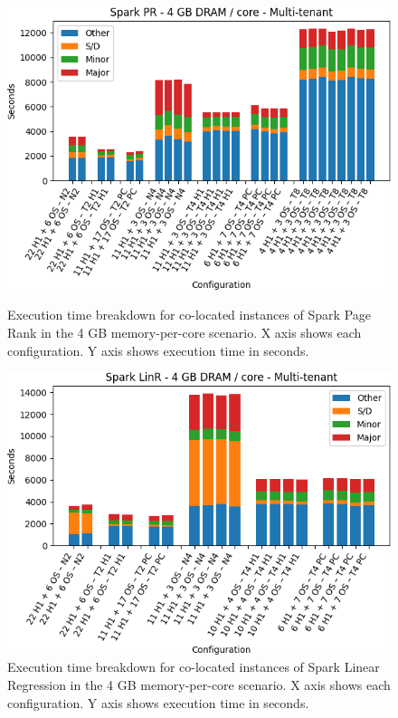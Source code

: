 \begin{figure}[thbp]
\centering
    \includegraphics[width=\linewidth]{./fig/pr64.png}
    \caption{Execution time breakdown for co-located instances of Spark
    Page Rank in the 4 GB memory-per-core scenario. X axis shows each configuration.
	Y axis shows execution time in seconds.}
    \label{fig:pr64}
	\includegraphics[width=\linewidth]{./fig/linr64.png}
    \caption{Execution time breakdown for co-located instances of Spark
    Linear Regression in the 4 GB memory-per-core scenario. X axis shows each configuration.
	Y axis shows execution time in seconds.}
    \label{fig:linr64}
\end{figure}


